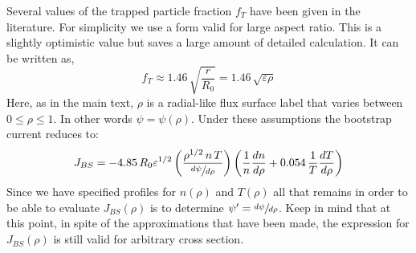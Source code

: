 Several values of the trapped particle fraction $f_T$ have been given in the literature.\cite{kessel_bootstrap} For simplicity we use a form valid for large aspect ratio. This is a slightly optimistic value but saves a large amount of detailed calculation. It can be written as,
\begin{equation}
	f_T \approx 1.46 \, \sqrt{ \frac{ r}{R_0 } } = 1.46 \, \sqrt{ \varepsilon \rho }
\end{equation}
Here, as in the main text, $\rho$ is a radial-like flux surface label that varies between $0 \le \rho \le 1 $. In other words $\psi = \psi(\rho)$. Under these assumptions the bootstrap current reduces to:
\begin{equation}
	\label{eq:bs_start}
	J_{BS} = -4.85 \, R_0 \varepsilon^{1/2} \left( \frac{ \rho^{1/2} \, n \, T }{ \sfrac{d\psi}{d\rho}} \right) \left( \frac{1}{n} \frac{dn}{d\rho} + 0.054 \, \frac{1}{T} \frac{dT}{d\rho} \right)
\end{equation}
Since we have specified profiles for $n(\rho)$ and $T(\rho)$ all that remains in order to be able to evaluate $J_{BS}(\rho)$ is to determine $\psi' = \sfrac{d\psi}{d\rho}$. Keep in mind that at this point, in spite of the approximations that have been made, the expression for $J_{BS}(\rho)$ is still valid for arbitrary cross section.

